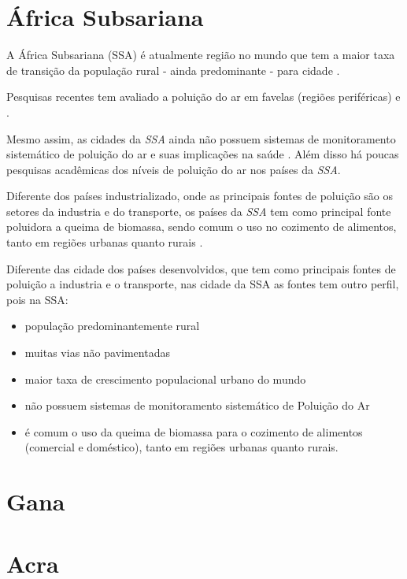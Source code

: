 \section{África Subsariana}

A África Subsariana (SSA) é atualmente região no mundo que tem a maior taxa de 
transição da população rural - ainda predominante - para cidade 
\citep{MONTGOMERY2008}.

Pesquisas recentes tem avaliado a poluição do ar em favelas 
(regiões periféricas) \citep{SCLAR2005} e \citep{RILEY2007}. 

Mesmo assim, as cidades da \textit{SSA} ainda não possuem sistemas de 
monitoramento sistemático de poluição do ar e suas implicações na saúde 
\citep{EZZATI2004}. 
Além disso há poucas pesquisas acadêmicas dos níveis de poluição do ar nos 
países da \textit{SSA}.

Diferente dos países industrializado, onde as principais fontes de poluição 
são os setores da industria e do transporte, os países da \textit{SSA} tem como 
principal fonte poluidora a queima de biomassa, sendo comum o uso no cozimento 
de alimentos, tanto em regiões urbanas quanto rurais \citep{SMITH2004}.

Diferente das cidade dos países desenvolvidos, que tem como principais 
fontes de poluição a industria e o transporte, nas cidade da SSA as fontes 
tem outro perfil, pois na SSA:
  \begin{itemize}
    \item população predominantemente rural
    \item muitas vias não pavimentadas
    \item maior taxa de crescimento populacional urbano do mundo
    \item não possuem sistemas de monitoramento sistemático de Poluição do Ar
    \item é comum o uso da queima de biomassa para o cozimento de alimentos  
          (comercial e doméstico), tanto em regiões urbanas quanto rurais.
  \end{itemize}

\section{Gana}

\section{Acra}

